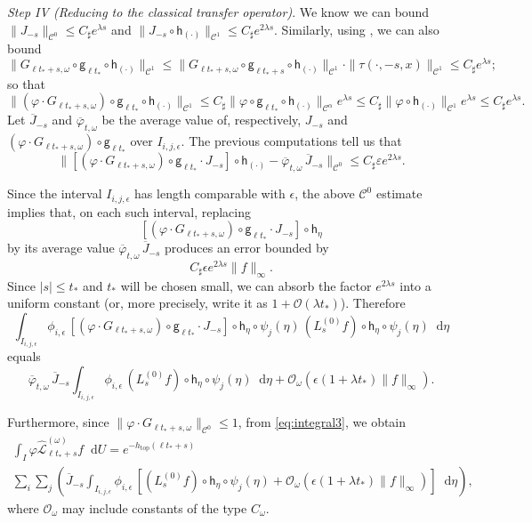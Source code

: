 \documentclass[11pt,letterpaper]{amsart}
\newcommand \cL {{\mathcal L}}
\newcommand \cO {{\mathcal{O}}}
\newcommand{\horo}{\mathsf{h}}
\newcommand{\geo}{\mathsf{g}}
\newcommand*{\diff}{\mathop{}\!\mathrm{d}}
\newcommand{\eps}{\epsilon}
\DeclareMathOperator{\topp}{top}
\theoremstyle{definition}
\begin{document}
\textit{Step IV (Reducing to the classical transfer operator)}. 
We know we can bound $\|J_{-s} \|_{\mathscr{C}^0} \leq C_\sharp e^{\lambda s}$ and $\|J_{-s} \circ \horo_{(\cdot)}\|_{\mathscr{C}^1} \leq C_\sharp e^{2\lambda s}$. Similarly, using , we can also bound
\[
\|G_{\ell {t_*}+s, \omega} \circ \geo_{\ell t_*}  \circ \horo_{(\cdot)}\|_{\mathscr{C}^1} \leq \|G_{\ell {t_*}+s, \omega} \circ \geo_{\ell t_*+s}  \circ \horo_{(\cdot)}\|_{\mathscr{C}^1} \cdot \|\tau(\cdot, -s,x)\|_{\mathscr{C}^1} \leq C_\sharp e^{\lambda s};
\]
so that
\[
\|(\varphi\cdot  G_{\ell {t_*}+s, \omega}) \circ \geo_{\ell t_*}\circ \horo_{(\cdot)}\|_{\mathscr{C}^{1}} \leq C_\sharp \|\varphi \circ \geo_{\ell t_*} \circ \horo_{(\cdot)}\|_{\mathscr{C}^{\alpha}}e^{\lambda s} \leq C_\sharp \|\varphi \circ \horo_{(\cdot)}\|_{\mathscr{C}^{1}}e^{\lambda s} \leq C_\sharp e^{\lambda s}.
\]
Let $\overline J_{-s} $ and $\overline \varphi_{t,\omega}$ be the average value of, respectively, $J_{-s}$ and $(\varphi\cdot  G_{\ell {t_*}+s, \omega}) \circ \geo_{\ell t_*}$ over $I_{i,j,\eps}$. The previous computations tell us that 
\[
\|[(\varphi\cdot  G_{\ell {t_*}+s, \omega}) \circ \geo_{\ell t_*} \cdot J_{-s}]\circ \horo_{(\cdot)} - {\overline \varphi_{t,\omega}} \, {\overline J_{-s}}\|_{\mathscr{C}^0} \leq C_\sharp \varepsilon e^{2\lambda s}.
\]

Since the interval $I_{i,j,\eps}$ has length comparable with $\eps$, the above $\mathscr C^0$ estimate implies that, on each such interval, replacing
\[
[(\varphi\cdot  G_{\ell {t_*}+s, \omega}) \circ \geo_{\ell t_*} \cdot J_{-s}]\circ \horo_{\eta}
\]
by its average value ${\overline \varphi_{t,\omega}}\,{\overline J_{-s}}$ produces an error bounded by
\[
C_\sharp \eps e^{2\lambda s}\|f\|_\infty.
\]
Since $|s|\le t_*$ and $t_*$ will be chosen small, we can absorb the factor $e^{2\lambda s}$ into a uniform constant (or, more precisely, write it as $1+\mathcal O(\lambda t_*)$). Therefore
\[
\int_{I_{i,j,\eps}} \phi_{i,\eps}\,
[(\varphi\cdot  G_{\ell {t_*}+s, \omega}) \circ \geo_{\ell t_*} \cdot J_{-s}]\circ \horo_{\eta} \circ \psi_j(\eta)\,
(L^{(0)}_{s}f) \circ \horo_{\eta}\circ \psi_j(\eta)\diff \eta
\]
equals
\[
{\overline \varphi_{t,\omega}}\,{\overline J_{-s}}
\int_{I_{i,j,\eps}} \phi_{i,\eps}\,
(L^{(0)}_{s}f) \circ \horo_{\eta}\circ \psi_j(\eta)\diff \eta
+\mathcal O_\omega\!\left(\eps (1+\lambda t_*)\|f\|_\infty\right).
\]


Furthermore, since $\| \varphi\cdot  G_{\ell {t_*}+s, \omega} \|_{\mathscr{C}^0} \leq 1$, from \eqref{eq:integral3}, we obtain
\begin{multline}\label{eq:integral4}
\int_I \varphi \hat\cL^{(\omega)}_{\ell {t_*}+s}f \diff U =
e^{-h_{\topp}(\ell {t_*}+s)} \\ \sum_{i} \sum_{j} \left( {\overline J_{-s}} \int_{I_{i,j,\eps}} \phi_{i,\eps} \, \left[ (L^{(0)}_{s}f) \circ \horo_{\eta}\circ \psi_j(\eta)  +\cO_\omega(\eps (1+ {\lambda t_*})\|f\|_{\infty}) \right] \diff \eta \right),
\end{multline}
where $\cO_\omega$ may include constants of the type $C_\omega$. 
\end{document}

